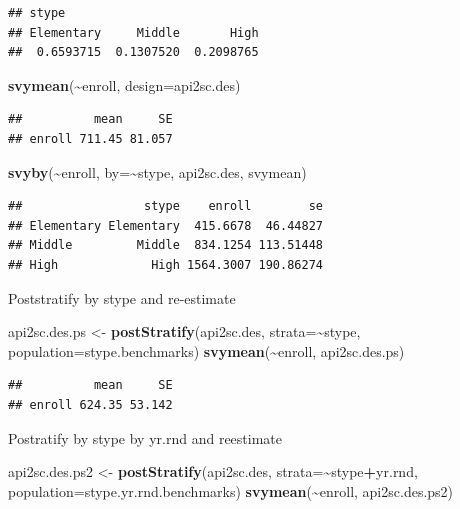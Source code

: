 \documentclass[
]{book}
\newenvironment{Shaded}{\begin{snugshade}}{\end{snugshade}}
\newcommand{\AttributeTok}[1]{\textcolor[rgb]{0.13,0.29,0.53}{#1}}
\newcommand{\FunctionTok}[1]{\textcolor[rgb]{0.13,0.29,0.53}{\textbf{#1}}}
\newcommand{\NormalTok}[1]{#1}
\newcommand{\OtherTok}[1]{\textcolor[rgb]{0.56,0.35,0.01}{#1}}
\newcommand{\SpecialCharTok}[1]{\textcolor[rgb]{0.81,0.36,0.00}{\textbf{#1}}}
\begin{document}
\begin{verbatim}
## stype
## Elementary     Middle       High 
##  0.6593715  0.1307520  0.2098765
\end{verbatim}

\begin{Shaded}
\begin{Highlighting}[]
\FunctionTok{svymean}\NormalTok{(}\SpecialCharTok{\textasciitilde{}}\NormalTok{enroll, }\AttributeTok{design=}\NormalTok{api2sc.des)}
\end{Highlighting}
\end{Shaded}

\begin{verbatim}
##          mean     SE
## enroll 711.45 81.057
\end{verbatim}

\begin{Shaded}
\begin{Highlighting}[]
\FunctionTok{svyby}\NormalTok{(}\SpecialCharTok{\textasciitilde{}}\NormalTok{enroll, }\AttributeTok{by=}\SpecialCharTok{\textasciitilde{}}\NormalTok{stype, api2sc.des, svymean)}
\end{Highlighting}
\end{Shaded}

\begin{verbatim}
##                 stype    enroll        se
## Elementary Elementary  415.6678  46.44827
## Middle         Middle  834.1254 113.51448
## High             High 1564.3007 190.86274
\end{verbatim}

Poststratify by stype and re-estimate

\begin{Shaded}
\begin{Highlighting}[]
\NormalTok{api2sc.des.ps }\OtherTok{\textless{}{-}} \FunctionTok{postStratify}\NormalTok{(api2sc.des, }\AttributeTok{strata=}\SpecialCharTok{\textasciitilde{}}\NormalTok{stype, }\AttributeTok{population=}\NormalTok{stype.benchmarks)}
\FunctionTok{svymean}\NormalTok{(}\SpecialCharTok{\textasciitilde{}}\NormalTok{enroll, api2sc.des.ps)}
\end{Highlighting}
\end{Shaded}

\begin{verbatim}
##          mean     SE
## enroll 624.35 53.142
\end{verbatim}

Postratify by stype by yr.rnd and reestimate

\begin{Shaded}
\begin{Highlighting}[]
\NormalTok{api2sc.des.ps2 }\OtherTok{\textless{}{-}} \FunctionTok{postStratify}\NormalTok{(api2sc.des, }\AttributeTok{strata=}\SpecialCharTok{\textasciitilde{}}\NormalTok{stype}\SpecialCharTok{+}\NormalTok{yr.rnd, }
                               \AttributeTok{population=}\NormalTok{stype.yr.rnd.benchmarks)}
\FunctionTok{svymean}\NormalTok{(}\SpecialCharTok{\textasciitilde{}}\NormalTok{enroll, api2sc.des.ps2)}
\end{Highlighting}
\end{Shaded}
\end{document}
